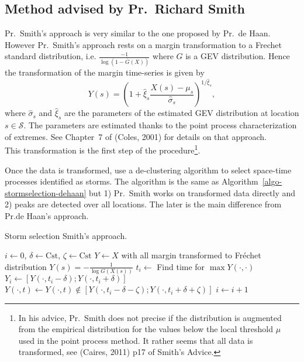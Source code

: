 \subsection{Method advised by Pr.~Richard Smith}
Pr.~Smith's approach is very similar to the one proposed by Pr.~de Haan. However Pr.~Smith's approach rests on a margin transformation to a Frechet standard distribution, i.e. $\frac{-1}{\log(1-\overline{G}(X))}$ where $G$ is a GEV distribution. Hence the transformation of the margin time-series is given by
\begin{equation}
\label{eq:pointprocess}
	Y(s) = \left( 1 + \hat{\xi}_{s} \frac{X(s) - \mu_{s} }{\hat{\sigma}_s} \right)^{1/\hat{\xi}_s},
\end{equation}
where $\hat{\sigma}_s$ and $\hat{\xi}_s$ are the parameters of the estimated GEV distribution at location $s \in \mathcal{S}$. The parameters are estimated thanks to the point process characterization of extremes. See Chapter~7 of (Coles, 2001) for details on that approach.\\

This transformation is the first step of the procedure\footnote{In his advice, Pr.~Smith does not precise if the distribution is augmented from the empirical distribution for the values below the local threshold $\mu$ used in the point process method. It rather seems that all data is transformed, see (Caires, 2011) p17 of Smith's Advice.}.

Once the data is transformed, use a de-clustering algorithm to select space-time processes identified as storms. The algorithm is the same as Algorithm~\ref{algo-stormselection-dehaan} but 1) Pr.~Smith works on transformed data directly and 2) peaks are detected over all locations. The later is the main difference from Pr.de Haan's approach.

\begin{algorithm}
	\caption{Storm selection Smith's approach.}
	\label{algo-stormselection-smith}
	\begin{algorithmic}
	\State $i \gets 0$, $\delta \gets \text{Cst}$, $\zeta \gets \text{Cst}$
	\State $Y \gets X$ with all margin transformed to Fr\'echet distribution $Y(s) = -\frac{1}{\log{G(X(s))}}$
	\State $t_i \gets$ Find time for $\max{ Y(\cdotp,\cdotp)}$
	\State $Y_i \gets [Y(\cdotp,t_i-\delta); Y(\cdotp,t_i+\delta) ]$
	\State $Y(\cdotp,t) \gets Y(\cdotp,t) \notin \left[ Y(\cdotp,t_i-\delta-\zeta); Y(\cdotp,t_i+\delta+\zeta) \right] $ 
	\State $i \gets i+1$
	\EndWhile
	\end{algorithmic}
\end{algorithm}

